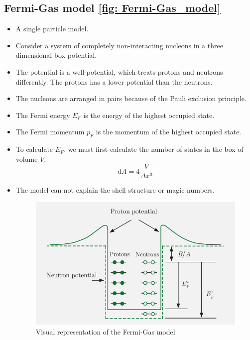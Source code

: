 \subsection{Fermi-Gas model \cref{fig: Fermi-Gas_model}}
\begin{itemize}    
    \item A single particle model.
    \item Consider a system of completely non-interacting nucleons in a three dimensional box potential. 
    \item The potential is a well-potential, which treats protons and neutrons differently. The protons has a lower potential than the neutrons. 
    \item The nucleons are arranged in pairs because of the Pauli exclusion principle. 
    \item The Fermi energy $E_{F}$ is the energy of the highest occupied state.
    \item The Fermi momentum $p_{F}$ is the momentum of the highest occupied state.
    \item To calculate $E_{F}$, we must first calculate the number of states in the box of volume $V$. 
    \begin{equation}
      \mathrm{d}A = 4 \frac{V}{Δx^3}
    \end{equation}
    \item The model can not explain the shell structure or magic numbers.
    
    \begin{figure}[h!]
    \centering
    \includegraphics[width = .55\textwidth]{Fermi-Gas_model.png}
    \caption{Visual representation of the Fermi-Gas model}
\end{figure}
    \label{fig: Fermi-Gas_model}
\end{itemize}


